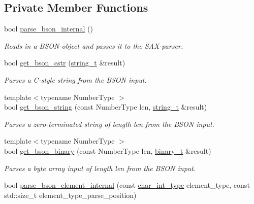 \subsection*{Private Member Functions}
\begin{DoxyCompactItemize}
\item 
bool \hyperlink{classnlohmann_1_1detail_1_1binary__reader_abf2051ba57d9ea9b378a2e7c14e22b34}{parse\+\_\+bson\+\_\+internal} ()
\begin{DoxyCompactList}\small\item\em Reads in a B\+S\+O\+N-\/object and passes it to the S\+A\+X-\/parser. \end{DoxyCompactList}\item 
bool \hyperlink{classnlohmann_1_1detail_1_1binary__reader_a354cbbaaea672c024ac949e1801c4302}{get\+\_\+bson\+\_\+cstr} (\hyperlink{classnlohmann_1_1detail_1_1binary__reader_a823c244e5dbf1a8edae40819f9434237}{string\+\_\+t} \&result)
\begin{DoxyCompactList}\small\item\em Parses a C-\/style string from the B\+S\+ON input. \end{DoxyCompactList}\item 
{\footnotesize template$<$typename Number\+Type $>$ }\\bool \hyperlink{classnlohmann_1_1detail_1_1binary__reader_a23921422802aa472360dd05023e20565}{get\+\_\+bson\+\_\+string} (const Number\+Type len, \hyperlink{classnlohmann_1_1detail_1_1binary__reader_a823c244e5dbf1a8edae40819f9434237}{string\+\_\+t} \&result)
\begin{DoxyCompactList}\small\item\em Parses a zero-\/terminated string of length {\itshape len} from the B\+S\+ON input. \end{DoxyCompactList}\item 
{\footnotesize template$<$typename Number\+Type $>$ }\\bool \hyperlink{classnlohmann_1_1detail_1_1binary__reader_a9940f56290b9278c58772eda2931e599}{get\+\_\+bson\+\_\+binary} (const Number\+Type len, \hyperlink{classnlohmann_1_1detail_1_1binary__reader_acf127bb88e4147fb692edabc2a0f0663}{binary\+\_\+t} \&result)
\begin{DoxyCompactList}\small\item\em Parses a byte array input of length {\itshape len} from the B\+S\+ON input. \end{DoxyCompactList}\item 
bool \hyperlink{classnlohmann_1_1detail_1_1binary__reader_a23bde2450d7a5772bf5051e36ff560a4}{parse\+\_\+bson\+\_\+element\+\_\+internal} (const \hyperlink{classnlohmann_1_1detail_1_1binary__reader_aa12ade9a8c0acaebef6399e3d446b970}{char\+\_\+int\+\_\+type} element\+\_\+type, const std\+::size\+\_\+t element\+\_\+type\+\_\+parse\+\_\+position)

\end{DoxyCompactItemize}

